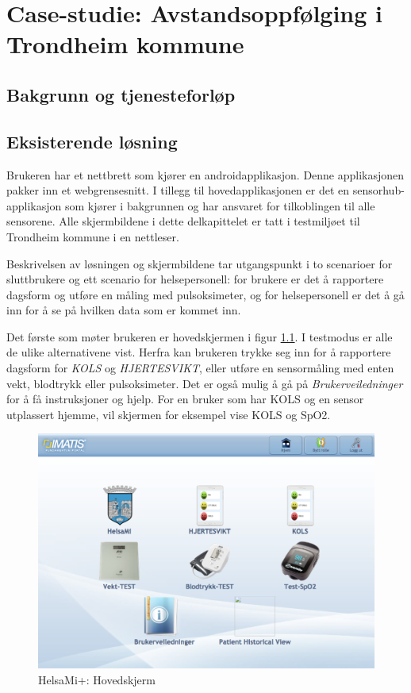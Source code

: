 \chapter{Case-studie: Avstandsoppfølging i Trondheim kommune}
\label{ch:case}

\section{Bakgrunn og tjenesteforløp}
\blindtext

\section{Eksisterende løsning}
Brukeren har et nettbrett som kjører en androidapplikasjon. Denne applikasjonen pakker inn
et webgrensesnitt. I tillegg til hovedapplikasjonen er det en sensorhub-applikasjon som kjører i bakgrunnen
og har ansvaret for tilkoblingen til alle sensorene. Alle skjermbildene i dette delkapittelet er tatt i testmiljøet
til Trondheim kommune i en nettleser.

Beskrivelsen av løsningen og skjermbildene tar utgangspunkt i to scenarioer for sluttbrukere
og ett scenario for helsepersonell: for brukere er det å rapportere dagsform og utføre en måling med pulsoksimeter,
og for helsepersonell er det å gå inn for å se på hvilken data som er kommet inn.

Det første som møter brukeren er hovedskjermen i figur \ref{fig:helsami_hovedskjerm}. I testmodus er alle de ulike
alternativene vist.
Herfra kan brukeren trykke seg inn for å rapportere dagsform for \textit{KOLS} og \textit{HJERTESVIKT}, eller utføre en sensormåling med
enten vekt, blodtrykk eller pulsoksimeter. Det er også mulig å gå på \textit{Brukerveiledninger} for å få instruksjoner og hjelp.
For en bruker som har KOLS og en sensor utplassert hjemme, vil skjermen for eksempel vise KOLS og SpO2.

\begin{figure}
\includegraphics[width=1.0\textwidth,center]{fig/helsami/hovedskjerm}
\caption{HelsaMi+: Hovedskjerm}
\label{fig:helsami_hovedskjerm}
\end{figure}

